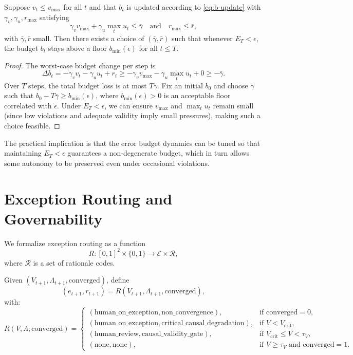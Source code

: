 \documentclass[11pt]{article}
\begin{document}
\begin{lemma}
\label{lem:error-budget}
Suppose $v_t \le v_{\max}$ for all $t$ and that $b_t$ is updated according to \eqref{eq:b-update} with $\gamma_v,\gamma_u,r_{\max}$ satisfying
\[
  \gamma_v v_{\max} + \gamma_u \max_t u_t \le \bar{\gamma}
  \quad\text{and}\quad
  r_{\max} \le \bar{r},
\]
with $\bar{\gamma},\bar{r}$ small.
Then there exists a choice of $(\bar{\gamma},\bar{r})$ such that whenever $E_T < \epsilon$,
the budget $b_t$ stays above a floor $b_{\min}(\epsilon)$ for all $t\le T$.
\end{lemma}

\begin{proof}
The worst-case budget change per step is
\[
  \Delta b_t = -\gamma_v v_t - \gamma_u u_t + r_t
  \ge -\gamma_v v_{\max} - \gamma_u \max_t u_t + 0
  \ge -\bar{\gamma}.
\]
Over $T$ steps, the total budget loss is at most $T\bar{\gamma}$.
Fix an initial $b_0$ and choose $\bar{\gamma}$ such that $b_0 - T\bar{\gamma} \ge b_{\min}(\epsilon)$, where $b_{\min}(\epsilon) > 0$ is an acceptable floor correlated with $\epsilon$.
Under $E_T < \epsilon$, we can ensure $v_{\max}$ and $\max_t u_t$ remain small (since low violations and adequate validity imply small pressures), making such a choice feasible.
\end{proof}

The practical implication is that the error budget dynamics can be tuned so that maintaining $E_T < \epsilon$ guarantees a non-degenerate budget, which in turn allows some autonomy to be preserved even under occasional violations.

\section{Exception Routing and Governability}
\label{sec:exception-routing}

We formalize exception routing as a function
\[
  R : [0,1]^2 \times \{0,1\} \to \mathcal{E}\times\mathcal{R},
\]
where $\mathcal{R}$ is a set of rationale codes.

Given $(V_{t+1},\Lambda_{t+1},\text{converged})$, define
\[
  (e_{t+1},r_{t+1}) = R(V_{t+1},\Lambda_{t+1},\mathrm{converged}),
\]
with:
\[
  R(V,\Lambda,\mathrm{converged}) =
  \begin{cases}
    (\mathrm{human\_on\_exception},\mathrm{non\_convergence}),
      & \text{if }\mathrm{converged} = 0,\\[4pt]
    (\mathrm{human\_on\_exception},\mathrm{critical\_causal\_degradation}),
      & \text{if } V < V_{\mathrm{crit}},\\[4pt]
    (\mathrm{human\_review},\mathrm{causal\_validity\_gate}),
      & \text{if } V_{\mathrm{crit}}\le V < \tau_V,\\[4pt]
    (\mathrm{none},\mathrm{none}),
      & \text{if } V \ge \tau_V \text{ and converged} = 1.
  \end{cases}
\]
\end{document}
